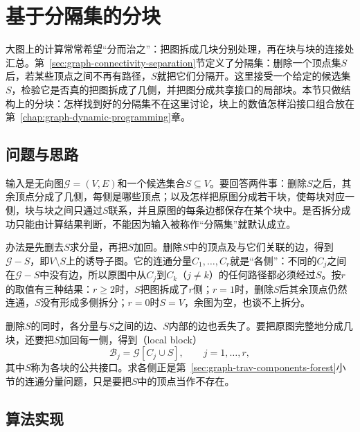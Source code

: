 \section{基于分隔集的分块}
\label{sec:graph-separator-blocks}

大图上的计算常常希望“分而治之”：把图拆成几块分别处理，再在块与块的连接处汇总。第~\ref{sec:graph-connectivity-separation}节定义了分隔集：删除一个顶点集$S$后，若某些顶点之间不再有路径，$S$就把它们分隔开。这里接受一个给定的候选集$S$，检验它是否真的把图拆成了几侧，并把图分成共享接口的局部块。本节只做结构上的分块：怎样找到好的分隔集不在这里讨论，块上的数值怎样沿接口组合放在第~\ref{chap:graph-dynamic-programming}章。

\subsection{问题与思路}
\label{sec:graph-trav-delete-separator}

输入是无向图$\mathcal G=(V,E)$和一个候选集合$S\subseteq V$。要回答两件事：删除$S$之后，其余顶点分成了几侧，每侧是哪些顶点；以及怎样把原图分成若干块，使每块对应一侧，块与块之间只通过$S$联系，并且原图的每条边都保存在某个块中。是否拆分成功只能由计算结果判断，不能因为输入被称作“分隔集”就默认成立。

办法是先删去$S$求分量，再把$S$加回。删除$S$中的顶点及与它们关联的边，得到$\mathcal G-S$，即$V\setminus S$上的诱导子图。它的连通分量$C_1,\ldots,C_r$就是“各侧”：不同的$C_j$之间在$\mathcal G-S$中没有边，所以原图中从$C_j$到$C_k$（$j\neq k$）的任何路径都必须经过$S$。按$r$的取值有三种结果：$r\geq2$时，$S$把图拆成了$r$侧；$r=1$时，删除$S$后其余顶点仍然连通，$S$没有形成多侧拆分；$r=0$时$S=V$，余图为空，也谈不上拆分。

删除$S$的同时，各分量与$S$之间的边、$S$内部的边也丢失了。要把原图完整地分成几块，还要把$S$加回每一侧，得到（local block）
\[
\mathcal B_j=\mathcal G[C_j\cup S],\qquad j=1,\ldots,r,
\]
其中$S$称为各块的公共接口。求各侧正是第~\ref{sec:graph-trav-components-forest}小节的连通分量问题，只是要把$S$中的顶点当作不存在。

\subsection{算法实现}
\label{sec:graph-trav-separator-implementation}

